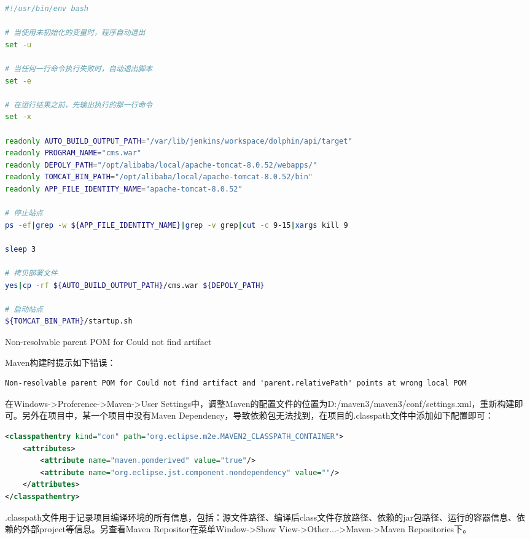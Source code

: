 \documentclass[8pt]{book}
\makeatletter
\numberwithin{dummy}{section}
\theoremstyle{ocrenumbox}
\theoremstyle{blacknumex}
\theoremstyle{blacknumbox}
\theoremstyle{ocrenum}
\renewcommand{\subsection}{\@startsection {subsection}{2}{\z@}
	{-3ex \@plus -0.1ex \@minus -.4ex}
	{0.5ex \@plus.2ex }
	{\normalfont\sffamily\bfseries}}
\makeatother
\begin{document}
\begin{lstlisting}[language=Bash]
#!/usr/bin/env bash

# 当使用未初始化的变量时，程序自动退出
set -u

# 当任何一行命令执行失败时，自动退出脚本
set -e

# 在运行结果之前，先输出执行的那一行命令
set -x

readonly AUTO_BUILD_OUTPUT_PATH="/var/lib/jenkins/workspace/dolphin/api/target"
readonly PROGRAM_NAME="cms.war"
readonly DEPOLY_PATH="/opt/alibaba/local/apache-tomcat-8.0.52/webapps/"
readonly TOMCAT_BIN_PATH="/opt/alibaba/local/apache-tomcat-8.0.52/bin"
readonly APP_FILE_IDENTITY_NAME="apache-tomcat-8.0.52"

# 停止站点
ps -ef|grep -w ${APP_FILE_IDENTITY_NAME}|grep -v grep|cut -c 9-15|xargs kill 9

sleep 3

# 拷贝部署文件
yes|cp -rf ${AUTO_BUILD_OUTPUT_PATH}/cms.war ${DEPOLY_PATH}

# 启动站点
${TOMCAT_BIN_PATH}/startup.sh
\end{lstlisting}

\subsection{Non-resolvable parent POM for Could not find artifact}

Maven构建时提示如下错误：

\begin{lstlisting}
Non-resolvable parent POM for Could not find artifact and 'parent.relativePath' points at wrong local POM
\end{lstlisting}

在Windows->Proference->Maven->User Settings中，调整Maven的配置文件的位置为D:/maven3/maven3/conf/settings.xml，重新构建即可。另外在项目中，某一个项目中没有Maven Dependency，导致依赖包无法找到，在项目的.classpath文件中添加如下配置即可：

\begin{lstlisting}[language=XML]
<classpathentry kind="con" path="org.eclipse.m2e.MAVEN2_CLASSPATH_CONTAINER">
	<attributes>
		<attribute name="maven.pomderived" value="true"/>
		<attribute name="org.eclipse.jst.component.nondependency" value=""/>
	</attributes>
</classpathentry>
\end{lstlisting}

.classpath文件用于记录项目编译环境的所有信息，包括：源文件路径、编译后class文件存放路径、依赖的jar包路径、运行的容器信息、依赖的外部project等信息。另查看Maven Repositor在菜单Window->Show View->Other...->Maven->Maven Repositories下。
\end{document}
